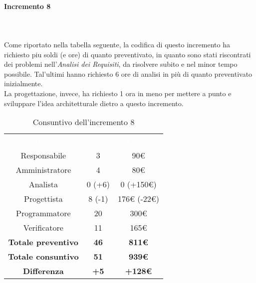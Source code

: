 \paragraph*{Incremento 8} \mbox{} \\ \mbox{} \\
Come riportato nella tabella seguente, la codifica di questo incremento ha richiesto piu soldi (e ore) di quanto preventivato, in quanto sono stati riscontrati dei problemi nell'\textit{Analisi dei Requisiti}, da risolvere subito e nel minor tempo possibile. Tal'ultimi hanno richiesto 6 ore di analisi in più di quanto preventivato inizialmente.\\
La progettazione, invece, ha richiesto 1 ora in meno per mettere a punto e sviluppare l'idea architetturale dietro a questo incremento.
\begin{table}[H]
\centering\renewcommand{\arraystretch}{1.5}
\caption{Consuntivo dell'incremento 8}
\vspace{0.2cm}
\begin{tabular}{ c c c }
\rowcolor{redafk}
\textcolor{white}{\textbf{Ruolo}} & \textcolor{white}{\textbf{Ore}} &
\textcolor{white}{\textbf{Costo}}  \\
Responsabile 	& 3 & 90€ \\
Amministratore 	& 4 & 80€ \\
Analista 		& 0 (+6)  & 0 (+150€) \\
Progettista		& 8 (-1)  & 176€ (-22€) \\
Programmatore	& 20 & 300€ \\
Verificatore 	& 11 & 165€  \\
\textbf{Totale preventivo} & \textbf{46} & \textbf{811€}  \\
\textbf{Totale consuntivo} & \textbf{51} & \textbf{939€} \\
\rowcolor{lastrowcolor}
\textbf{Differenza} & \textbf{+5} & \textbf{+128€} \\
\end{tabular}
\end{table}

